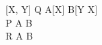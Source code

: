 \documentclass{article}
\begin{document}
\begin{circus}
    \circprocess\ [X, Y] Q \circdef A[X] \intchoice B[Y \cross X] \\
    \circprocess\ P \circdef A \extchoice B \\
    \circprocess\ R \circdef A \circseq B
\end{circus}




%
%

\end{document}
